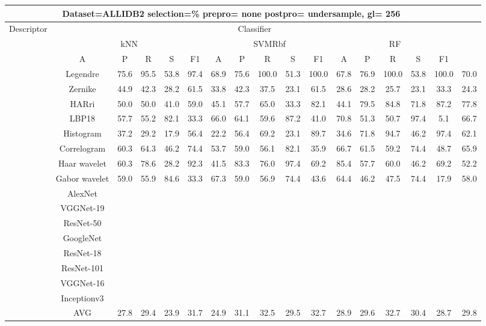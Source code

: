 \documentclass[12pt,italian]{article}
\begin{document}
\begin{tiny}
\begin{longtable}{lcccccccccccccccc}
\toprule
\multicolumn{16}{c}{Dataset=ALLIDB2 selection=\% prepro= none postpro= undersample, gl= 256} \\ 
\toprule
Descriptor & \multicolumn{15}{c}{Classifier} \\ 
& \multicolumn{5}{c}{kNN} & \multicolumn{5}{c}{SVMRbf} & \multicolumn{5}{c}{RF} \\ 
& A & P & R & S & F1 & A & P & R & S & F1 & A & P & R & S & F1 \\ 
\midrule
& Legendre & 75.6 & 95.5 & 53.8 & 97.4 & 68.9 & 75.6 & 100.0 & 51.3 & 100.0 & 67.8 & 76.9 & 100.0 & 53.8 & 100.0 & 70.0 \\ 
& Zernike & 44.9 & 42.3 & 28.2 & 61.5 & 33.8 & 42.3 & 37.5 & 23.1 & 61.5 & 28.6 & 28.2 & 25.7 & 23.1 & 33.3 & 24.3 \\ 
& HARri & 50.0 & 50.0 & 41.0 & 59.0 & 45.1 & 57.7 & 65.0 & 33.3 & 82.1 & 44.1 & 79.5 & 84.8 & 71.8 & 87.2 & 77.8 \\ 
& LBP18 & 57.7 & 55.2 & 82.1 & 33.3 & 66.0 & 64.1 & 59.6 & 87.2 & 41.0 & 70.8 & 51.3 & 50.7 & 97.4 &  5.1 & 66.7 \\ 
& Histogram & 37.2 & 29.2 & 17.9 & 56.4 & 22.2 & 56.4 & 69.2 & 23.1 & 89.7 & 34.6 & 71.8 & 94.7 & 46.2 & 97.4 & 62.1 \\ 
& Correlogram & 60.3 & 64.3 & 46.2 & 74.4 & 53.7 & 59.0 & 56.1 & 82.1 & 35.9 & 66.7 & 61.5 & 59.2 & 74.4 & 48.7 & 65.9 \\ 
& Haar wavelet & 60.3 & 78.6 & 28.2 & 92.3 & 41.5 & 83.3 & 76.0 & 97.4 & 69.2 & 85.4 & 57.7 & 60.0 & 46.2 & 69.2 & 52.2 \\ 
& Gabor wavelet & 59.0 & 55.9 & 84.6 & 33.3 & 67.3 & 59.0 & 56.9 & 74.4 & 43.6 & 64.4 & 46.2 & 47.5 & 74.4 & 17.9 & 58.0 \\ 
& AlexNet \\ 
& VGGNet-19 \\ 
& ResNet-50 \\ 
& GoogleNet \\ 
& ResNet-18 \\ 
& ResNet-101 \\ 
& VGGNet-16 \\ 
& Inceptionv3 \\ 
\hline
& AVG & 27.8 & 29.4 & 23.9 & 31.7 & 24.9 & 31.1 & 32.5 & 29.5 & 32.7 & 28.9 & 29.6 & 32.7 & 30.4 & 28.7 & 29.8 \\ 
\hline
\bottomrule
\end{longtable} 


\end{tiny}
\end{document}
